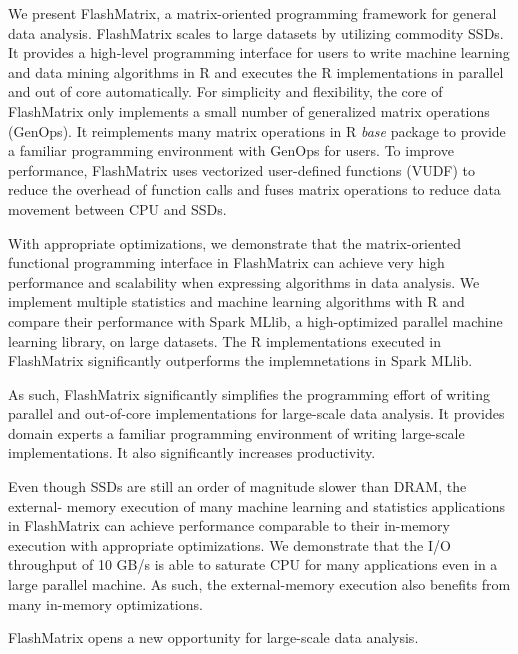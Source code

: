 We present FlashMatrix, a matrix-oriented programming framework for general
data analysis. FlashMatrix scales to large datasets by utilizing commodity SSDs.
It provides a high-level programming interface
for users to write machine learning and data mining algorithms in R and
executes the R implementations in parallel and out of core automatically.
For simplicity and flexibility, the core of FlashMatrix only implements
a small number of generalized matrix operations (GenOps). It reimplements
many matrix operations in R \textit{base} package to provide a familiar
programming environment with GenOps for users. To improve performance,
FlashMatrix uses vectorized user-defined functions (VUDF) to reduce the
overhead of function calls and fuses matrix operations to reduce data movement
between CPU and SSDs.

With appropriate optimizations, we demonstrate that the matrix-oriented functional
programming interface in FlashMatrix can achieve very high performance and
scalability when expressing algorithms in data analysis. We implement multiple
statistics and
machine learning algorithms with R and compare their performance with Spark
MLlib, a high-optimized parallel machine learning library, on large datasets.
The R implementations executed in FlashMatrix significantly outperforms
the implemnetations in Spark MLlib.

As such, FlashMatrix significantly simplifies the programming effort of writing
parallel and out-of-core implementations for large-scale data analysis. It
provides domain experts a familiar programming environment of writing large-scale
implementations. It also significantly increases productivity.

Even though SSDs are still an order of magnitude slower than DRAM, the external-
memory execution of many machine learning and statistics applications in
FlashMatrix can achieve performance comparable to their in-memory execution
with appropriate optimizations. We demonstrate that the I/O throughput of 10 GB/s
is able to saturate CPU for many applications even in a large parallel
machine. As such, the external-memory execution also benefits from many in-memory
optimizations.

FlashMatrix opens a new opportunity for large-scale data analysis.

